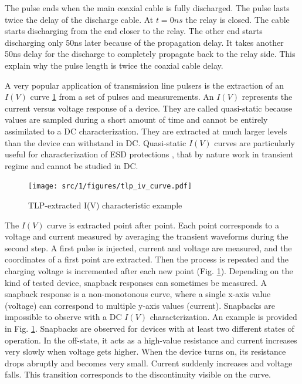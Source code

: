 The pulse ends when the main coaxial cable is fully discharged.
The pulse lasts twice the delay of the discharge cable.
At $t=0ns$ the relay is closed.
The cable starts discharging from the end closer to the relay.
The other end starts discharging only 50ns later because of the propagation delay.
It takes another 50ns delay for the discharge to completely propagate back to the relay side.
This explain why the pulse length is twice the coaxial cable delay.

A very popular application of transmission line pulsers is the extraction of an $I(V)$ curve \ref{fig:iv-curve-extraction} from a set of pulses and measurements.
An $I(V)$ represents the current versus voltage response of a device.
They are called quasi-static because values are sampled during a short amount of time and cannot be entirely assimilated to a DC characterization.
They are extracted at much larger levels than the device can withstand in DC.
Quasi-static $I(V)$ curves are particularly useful for characterization of ESD protections \cite{TLPforESDProtectionCz}, that by nature work in transient regime and cannot be studied in DC.

\begin{figure}[!h]
  \centering
  \texttt{[image: src/1/figures/tlp\_iv\_curve.pdf]}
  \caption{TLP-extracted I(V) characteristic example}
  \label{fig:iv-curve-extraction}
\end{figure}

The $I(V)$ curve is extracted point after point.
Each point corresponds to a voltage and current measured by averaging the transient waveforms during the second step.
A first pulse is injected, current and voltage are measured, and the coordinates of a first point are extracted.
Then the process is repeated and the charging voltage is incremented after each new point (Fig. \ref{fig:iv-curve-extraction}).
Depending on the kind of tested device, snapback responses can sometimes be measured.
A snapback response is a non-monotonous curve, where a single x-axis value (voltage) can correspond to multiple y-axis values (current).
Snapbacks are impossible to observe with a DC $I(V)$ characterization.
An example is provided in Fig. \ref{fig:iv-curve-extraction}.
Snapbacks are observed for devices with at least two different states of operation.
In the off-state, it acts as a high-value resistance and current increases very slowly when voltage gets higher.
When the device turns on, its resistance drops abruptly and becomes very small.
Current suddenly increases and voltage falls.
This transition corresponds to the discontinuity visible on the curve.


